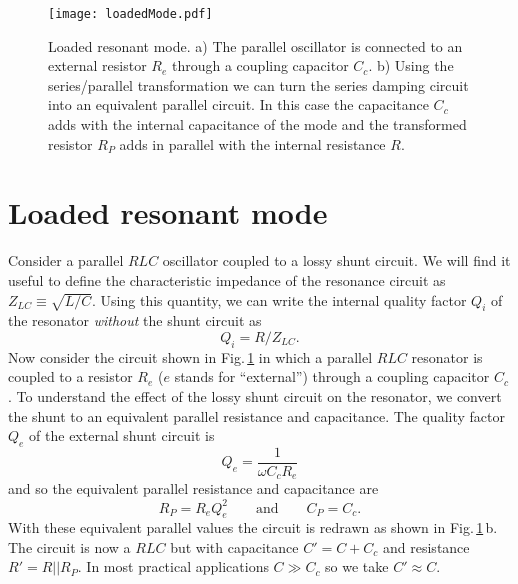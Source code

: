 \begin{figure}
\begin{centering}
\texttt{[image: loadedMode.pdf]} 
\par\end{centering}
\caption{Loaded resonant mode.
a) The parallel oscillator is connected to an external resistor $R_e$ through a coupling capacitor $C_c$.
b) Using the series/parallel transformation we can turn the series damping circuit into an equivalent parallel circuit.
In this case the capacitance $C_c$ adds with the internal capacitance of the mode and the transformed resistor $R_P$ adds in parallel with the internal resistance $R$.}
\label{Fig:loadedMode}
\end{figure}

\section{Loaded resonant mode}

Consider a parallel $RLC$ oscillator coupled to a lossy shunt circuit.
We will find it useful to define the characteristic impedance of the resonance circuit as $Z_{LC} \equiv \sqrt{L/C}$.
Using this quantity, we can write the internal quality factor $Q_i$ of the resonator \emph{without} the shunt circuit as
\begin{equation}
Q_i = R/Z_{LC} . \end{equation}
Now consider the circuit shown in Fig.\,\ref{Fig:loadedMode} in which a parallel $RLC$ resonator is coupled to a resistor $R_e$ ($e$ stands for ``external'') through a coupling capacitor $C_c$.
To understand the effect of the lossy shunt circuit on the resonator, we convert the shunt to an equivalent parallel resistance and capacitance.
The quality factor $Q_e$ of the external shunt circuit is \begin{equation}
Q_e = \frac{1}{\omega C_c R_e} \end{equation}
and so the equivalent parallel resistance and capacitance are \begin{equation}
R_P = R_e Q_e^2 \qquad \text{and} \qquad C_P = C_c  . \end{equation}
With these equivalent parallel values the circuit is redrawn as shown in Fig.\,\ref{Fig:loadedMode}\,b.
The circuit is now a $RLC$ but with capacitance $C' = C + C_c$ and resistance $R'= R||R_P$.
In most practical applications $C \gg C_c$ so we take $C' \approx C$.

